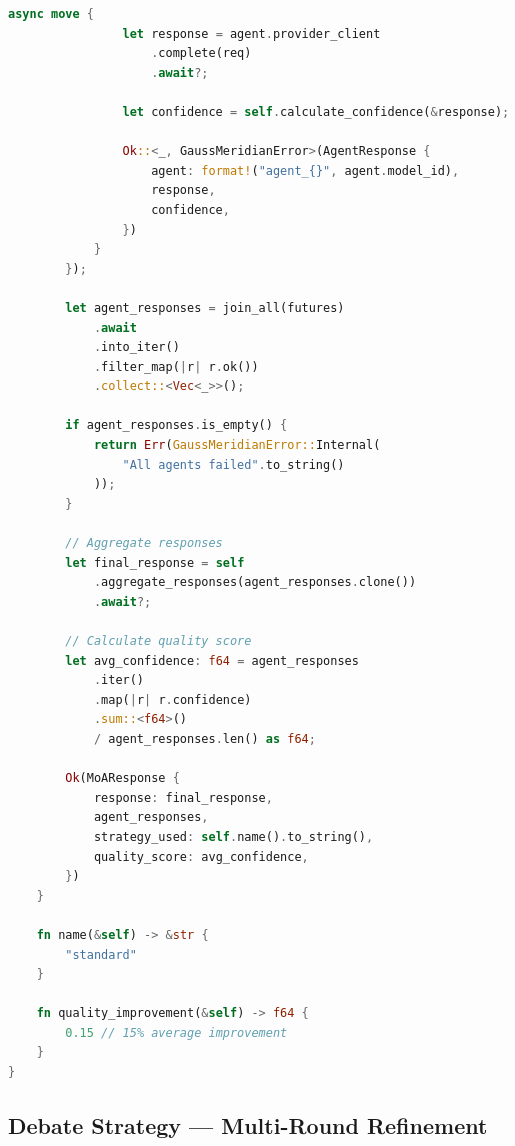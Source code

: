 \documentclass[12pt,a4paper,twoside]{report}
\begin{document}
\begin{lstlisting}[language=Rust,caption={Standard MoA Strategy - crates/gaussmeridian-moa/src/strategies/standard.rs}]
            async move {
                let response = agent.provider_client
                    .complete(req)
                    .await?;
                
                let confidence = self.calculate_confidence(&response);
                
                Ok::<_, GaussMeridianError>(AgentResponse {
                    agent: format!("agent_{}", agent.model_id),
                    response,
                    confidence,
                })
            }
        });
        
        let agent_responses = join_all(futures)
            .await
            .into_iter()
            .filter_map(|r| r.ok())
            .collect::<Vec<_>>();
        
        if agent_responses.is_empty() {
            return Err(GaussMeridianError::Internal(
                "All agents failed".to_string()
            ));
        }
        
        // Aggregate responses
        let final_response = self
            .aggregate_responses(agent_responses.clone())
            .await?;
        
        // Calculate quality score
        let avg_confidence: f64 = agent_responses
            .iter()
            .map(|r| r.confidence)
            .sum::<f64>()
            / agent_responses.len() as f64;
        
        Ok(MoAResponse {
            response: final_response,
            agent_responses,
            strategy_used: self.name().to_string(),
            quality_score: avg_confidence,
        })
    }
    
    fn name(&self) -> &str {
        "standard"
    }
    
    fn quality_improvement(&self) -> f64 {
        0.15 // 15% average improvement
    }
}
\end{lstlisting}

\subsection{Debate Strategy --- Multi-Round Refinement}
\end{document}
